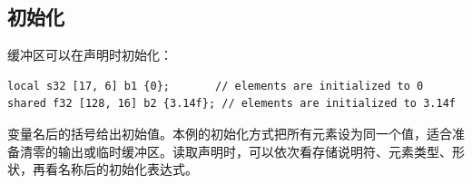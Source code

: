 \subsection*{初始化}

缓冲区可以在声明时初始化：

\begin{lstlisting}[language=croqtile,caption={初始化}]
local s32 [17, 6] b1 {0};       // elements are initialized to 0
shared f32 [128, 16] b2 {3.14f}; // elements are initialized to 3.14f
\end{lstlisting}

变量名后的括号给出初始值。本例的初始化方式把所有元素设为同一个值，适合准备清零的输出或临时缓冲区。读取声明时，可以依次看存储说明符、元素类型、形状，再看名称后的初始化表达式。
